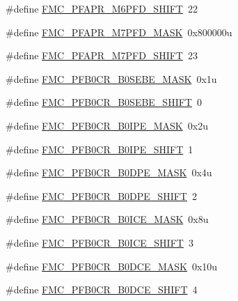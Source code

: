 \begin{DoxyCompactItemize}
\item 
\#define \hyperlink{group___f_m_c___register___masks_ga5ff1d949214bab253e7b426ca8fb6884}{F\+M\+C\+\_\+\+P\+F\+A\+P\+R\+\_\+\+M6\+P\+F\+D\+\_\+\+S\+H\+I\+FT}~22
\item 
\#define \hyperlink{group___f_m_c___register___masks_gac0652379651a8388e65f2e96358b72f1}{F\+M\+C\+\_\+\+P\+F\+A\+P\+R\+\_\+\+M7\+P\+F\+D\+\_\+\+M\+A\+SK}~0x800000u
\item 
\#define \hyperlink{group___f_m_c___register___masks_ga4589e8d60db033a3ab174e976a5d3dcf}{F\+M\+C\+\_\+\+P\+F\+A\+P\+R\+\_\+\+M7\+P\+F\+D\+\_\+\+S\+H\+I\+FT}~23
\item 
\#define \hyperlink{group___f_m_c___register___masks_ga9eede1bc45bf3cbaf00b4e9960f5e7eb}{F\+M\+C\+\_\+\+P\+F\+B0\+C\+R\+\_\+\+B0\+S\+E\+B\+E\+\_\+\+M\+A\+SK}~0x1u
\item 
\#define \hyperlink{group___f_m_c___register___masks_gac7bd1c5a4c5f35eb2d02351977e6a274}{F\+M\+C\+\_\+\+P\+F\+B0\+C\+R\+\_\+\+B0\+S\+E\+B\+E\+\_\+\+S\+H\+I\+FT}~0
\item 
\#define \hyperlink{group___f_m_c___register___masks_gab46173be15cdda210e83a041f8eeb809}{F\+M\+C\+\_\+\+P\+F\+B0\+C\+R\+\_\+\+B0\+I\+P\+E\+\_\+\+M\+A\+SK}~0x2u
\item 
\#define \hyperlink{group___f_m_c___register___masks_ga9fccb996200782cf4a1ec8d2418da2e5}{F\+M\+C\+\_\+\+P\+F\+B0\+C\+R\+\_\+\+B0\+I\+P\+E\+\_\+\+S\+H\+I\+FT}~1
\item 
\#define \hyperlink{group___f_m_c___register___masks_gaff35af9c8bc3c5cf2f6bf9dd76253a02}{F\+M\+C\+\_\+\+P\+F\+B0\+C\+R\+\_\+\+B0\+D\+P\+E\+\_\+\+M\+A\+SK}~0x4u
\item 
\#define \hyperlink{group___f_m_c___register___masks_gabe5b35383e6d2198f45bc66429b0ce61}{F\+M\+C\+\_\+\+P\+F\+B0\+C\+R\+\_\+\+B0\+D\+P\+E\+\_\+\+S\+H\+I\+FT}~2
\item 
\#define \hyperlink{group___f_m_c___register___masks_ga093ec774220ef7557784c2cea999502e}{F\+M\+C\+\_\+\+P\+F\+B0\+C\+R\+\_\+\+B0\+I\+C\+E\+\_\+\+M\+A\+SK}~0x8u
\item 
\#define \hyperlink{group___f_m_c___register___masks_ga7595313d5ea6aa0ddb4fa755bad06110}{F\+M\+C\+\_\+\+P\+F\+B0\+C\+R\+\_\+\+B0\+I\+C\+E\+\_\+\+S\+H\+I\+FT}~3
\item 
\#define \hyperlink{group___f_m_c___register___masks_ga2ef77cab94225466d9301d03fc02b432}{F\+M\+C\+\_\+\+P\+F\+B0\+C\+R\+\_\+\+B0\+D\+C\+E\+\_\+\+M\+A\+SK}~0x10u
\item 
\#define \hyperlink{group___f_m_c___register___masks_gaf25cde827cdccda0268d84a381fb8ab2}{F\+M\+C\+\_\+\+P\+F\+B0\+C\+R\+\_\+\+B0\+D\+C\+E\+\_\+\+S\+H\+I\+FT}~4

\end{DoxyCompactItemize}
